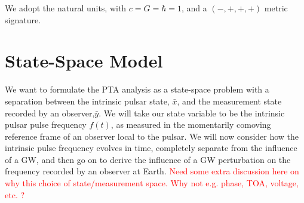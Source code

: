 \documentclass[fleqn,usenatbib,useAMS]{mnras}
\begin{document}
\noindent We adopt the natural units, with $c = G = \hbar = 1$, and a
$(-,+,+,+)$ metric signature. \newline 



\section{State-Space Model}
We want to formulate the PTA analysis as a state-space problem with a separation between the intrinsic pulsar state, $\bar{x}$, and the measurement state recorded by an observer,$\bar{y}$. We will take our state variable to be the intrinsic pulsar pulse frequency $f(t)$, as measured in the momentarily comoving reference frame of an observer local to the pulsar. We will now consider how the intrinsic pulse frequency evolves in time, completely separate from the influence of a GW, and then go on to derive the  influence of a GW perturbation on the frequency recorded by an observer at Earth. \textcolor{red}{Need some extra discussion here on why this choice of state/measurement space. Why not e.g. phase, TOA, voltage, etc. ?}
\end{document}

